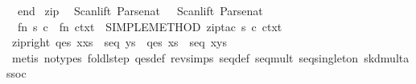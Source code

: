 \begin{isabellebody}
\ \ end\isanewline
{}\isanewline
\isanewline
{}\isamarkupfalse%
\ zip\ {}\ {}\isanewline
Scan{}lift\ Parse{}nat\ \ {}{}\ Scan{}lift\ Parse{}nat\ {}{}\isanewline
\ \ {}fn\ {}s{}\ c{}\ {}{}\ fn\ ctxt\ {}{}\ SIMPLE{}METHOD\ {}zip{}tac\ s\ c\ ctxt\ {}{}{}\isanewline
{}%
\endisatagML
{\isafoldML}%
%
\isadelimML
\isanewline
%
\endisadelimML
\isanewline
{}\isamarkupfalse%
\ zip{}right{}\ {}qes\ {}x{}xs{}\ {}\ seq\ ys\ {}\ qes\ xs\ {}\ seq\ {}x{}ys{}{}\isanewline
%
\isadelimproof
\ \ %
\endisadelimproof
%
\isatagproof
{}\isamarkupfalse%
\ {}metis\ {}no{}types{}\ foldl{}step\ qes{}def\ rev{}simps{}{}{}\ seq{}def\ seq{}mult\ seq{}singleton\ skd{}mult{}assoc{}%
\endisatagproof
{\isafoldproof}%
%
\isadelimproof
\isanewline

\end{isabellebody}
